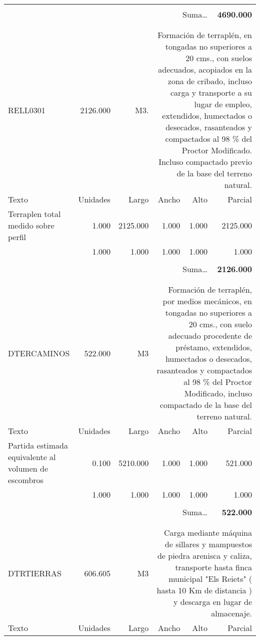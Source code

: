 \documentclass{book}%
\begin{document}
\begin{longtable}{lrrrrr}
&&&&&\\%
\multicolumn{5}{r}{Suma\ldots}&\textbf{4690.000}\\%
\hline%
&&&&&\\%
&&&&&\\%
RELL0301&2126.000& M3.&\multicolumn{3}{p{6cm}}{\scriptsize Formación de terraplén, en tongadas no superiores a 20 cms., con suelos adecuados, acopiados en la zona de cribado, incluso carga y transporte a su lugar de empleo, extendidos, humectados o desecados, rasanteados y compactados al 98 \% del Proctor Modificado. Incluso compactado previo de la base del terreno natural.\normalsize}\\%
Texto&Unidades&Largo&Ancho&Alto&Parcial\\%
\hline%
\multicolumn{1}{p{3.5cm}}{Terraplen total medido sobre perfil}&1.000&2125.000&1.000&1.000&2125.000\\%
\multicolumn{1}{p{3.5cm}}{}&1.000&1.000&1.000&1.000&1.000\\%
&&&&&\\%
\multicolumn{5}{r}{Suma\ldots}&\textbf{2126.000}\\%
\hline%
&&&&&\\%
&&&&&\\%
DTERCAMINOS&522.000& M3&\multicolumn{3}{p{6cm}}{\scriptsize Formación de terraplén, por medios mecánicos, en tongadas no superiores a 20 cms., con suelo adecuado procedente de préstamo, extendidos, humectados o desecados, rasanteados y compactados al 98 \% del Proctor Modificado, incluso compactado de la base del terreno natural.\normalsize}\\%
Texto&Unidades&Largo&Ancho&Alto&Parcial\\%
\hline%
\multicolumn{1}{p{3.5cm}}{Partida estimada equivalente al volumen de escombros}&0.100&5210.000&1.000&1.000&521.000\\%
\multicolumn{1}{p{3.5cm}}{}&1.000&1.000&1.000&1.000&1.000\\%
&&&&&\\%
\multicolumn{5}{r}{Suma\ldots}&\textbf{522.000}\\%
\hline%
&&&&&\\%
&&&&&\\%
DTRTIERRAS&606.605& M3&\multicolumn{3}{p{6cm}}{\scriptsize Carga mediante máquina de sillares y mampuestos de piedra arenisca y caliza, transporte hasta finca municipal  "Els Reiets" ( hasta 10 Km de distancia ) y descarga en lugar de almacenaje.\normalsize}\\%
Texto&Unidades&Largo&Ancho&Alto&Parcial\\%

\end{longtable}
\end{document}
